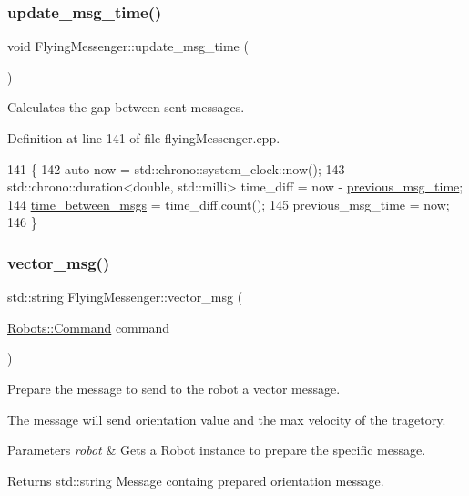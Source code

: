 \subsubsection{\texorpdfstring{update\+\_\+msg\+\_\+time()}{update\_msg\_time()}}
{\footnotesize\ttfamily void Flying\+Messenger\+::update\+\_\+msg\+\_\+time (\begin{DoxyParamCaption}{ }\end{DoxyParamCaption})}



Calculates the gap between sent messages. 



Definition at line 141 of file flying\+Messenger.\+cpp.


\begin{DoxyCode}
141                                       \{
142     \textcolor{keyword}{auto} now = std::chrono::system\_clock::now();
143     std::chrono::duration<double, std::milli> time\_diff = now - 
      \hyperlink{class_flying_messenger_af8611988cd9ba1712ae9e18c7adf0e6c}{previous\_msg\_time};
144     \hyperlink{class_flying_messenger_a78023f5c0e3ee9242e0101d40f2a0d3c}{time\_between\_msgs} = time\_diff.count();
145     previous\_msg\_time = now;
146 \}
\end{DoxyCode}
\mbox{\label{class_flying_messenger_a1d4e86acb2f76d531f869f28e200d6c3}} 
\subsubsection{\texorpdfstring{vector\+\_\+msg()}{vector\_msg()}}
{\footnotesize\ttfamily std\+::string Flying\+Messenger\+::vector\+\_\+msg (\begin{DoxyParamCaption}\item[{\hyperlink{struct_robots_1_1_command}{Robots\+::\+Command}}]{command }\end{DoxyParamCaption})\hspace{0.3cm}{\ttfamily [private]}}



Prepare the message to send to the robot a vector message. 

The message will send orientation value and the max velocity of the tragetory.


\begin{DoxyParams}{Parameters}
{\em robot} & Gets a Robot instance to prepare the specific message. \\
\hline
\end{DoxyParams}
\begin{DoxyReturn}{Returns}
std\+::string Message containg prepared orientation message. 
\end{DoxyReturn}


